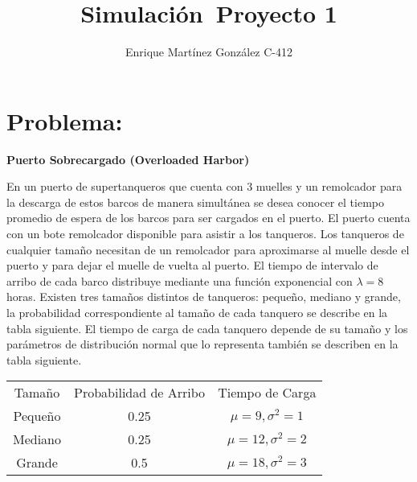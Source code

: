 \documentclass[titlepage,11pt]{scrartcl}
\title{	
    \normalfont\normalsize
	\vspace{25pt}
	{\huge Simulación\ Proyecto 1}
	\vspace{12pt}
}
\author{\LARGE Enrique Martínez González C-412}
\date{}
\begin{document}
\maketitle

\section{Problema:}

	\textbf{Puerto Sobrecargado (Overloaded Harbor)}

	En un puerto de supertanqueros que cuenta con 3 muelles y un remolcador para la descarga de estos barcos de manera simultánea se desea conocer el tiempo promedio de espera de los barcos para ser cargados en el puerto. El puerto cuenta con un bote remolcador disponible para asistir a los tanqueros. Los tanqueros de cualquier tamaño necesitan de un remolcador para aproximarse al muelle desde el puerto y para dejar el muelle de vuelta al puerto. El tiempo de intervalo de arribo de cada barco distribuye mediante una función exponencial con $\lambda = 8$ horas. Existen tres tamaños distintos de tanqueros: pequeño, mediano y grande, la probabilidad correspondiente al tamaño de cada tanquero se describe en la tabla siguiente. El tiempo de carga de cada tanquero depende de su tamaño y los parámetros de distribución normal que lo representa también se describen en la tabla siguiente.

	\begin{center}
		\begin{tabular}
			{c c c}
			\rule[-1ex]{0pt}{1.5ex} Tamaño & Probabilidad de Arribo & Tiempo de Carga \\
			\rule[-1ex]{0pt}{1.5ex} Pequeño & 0.25 & $\mu = 9, \sigma^2 = 1$ \\
			\rule[-1ex]{0pt}{1.5ex} Mediano & 0.25 & $\mu = 12, \sigma^2 = 2$ \\
			\rule[-1ex]{0pt}{1.5ex} Grande & 0.5 & $\mu = 18, \sigma^2 = 3$ \\
		\end{tabular}
	\end{center}
\end{document}
